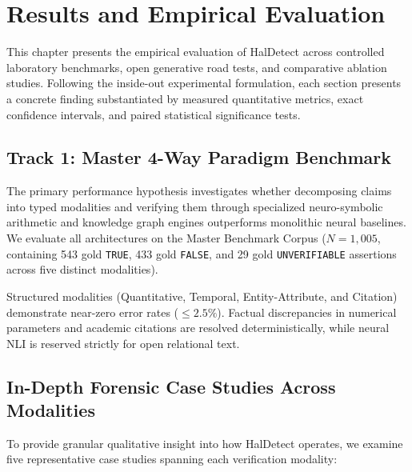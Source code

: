 \chapter{Results and Empirical Evaluation}
\label{ch:results}

This chapter presents the empirical evaluation of HalDetect across controlled laboratory benchmarks, open generative road tests, and comparative ablation studies. Following the inside-out experimental formulation, each section presents a concrete finding substantiated by measured quantitative metrics, exact confidence intervals, and paired statistical significance tests.

\section{Track 1: Master 4-Way Paradigm Benchmark}
\label{sec:track1_results}

The primary performance hypothesis investigates whether decomposing claims into typed modalities and verifying them through specialized neuro-symbolic arithmetic and knowledge graph engines outperforms monolithic neural baselines. We evaluate all architectures on the Master Benchmark Corpus ($N = 1{,}005$, containing 543 gold \texttt{TRUE}, 433 gold \texttt{FALSE}, and 29 gold \texttt{UNVERIFIABLE} assertions across five distinct modalities).



Structured modalities (Quantitative, Temporal, Entity-Attribute, and Citation) demonstrate near-zero error rates ($\le 2.5\%$). Factual discrepancies in numerical parameters and academic citations are resolved deterministically, while neural NLI is reserved strictly for open relational text.

\section{In-Depth Forensic Case Studies Across Modalities}
\label{sec:forensic_case_studies}

To provide granular qualitative insight into how HalDetect operates, we examine five representative case studies spanning each verification modality:


